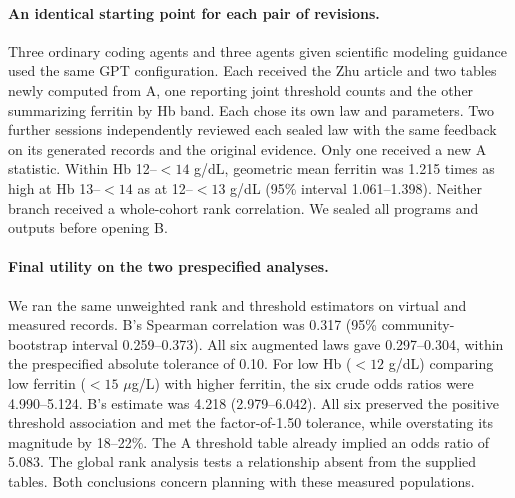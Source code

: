 \documentclass[sigconf,anonymous,review]{acmart}
\begin{document}
\paragraph{An identical starting point for each pair of revisions.}
Three ordinary coding agents and three agents given scientific modeling guidance used the same GPT configuration. Each received the Zhu article and two tables newly computed from A, one reporting joint threshold counts and the other summarizing ferritin by Hb band. Each chose its own law and parameters. Two further sessions independently reviewed each sealed law with the same feedback on its generated records and the original evidence. Only one received a new A statistic. Within Hb 12--$<14$ g/dL, geometric mean ferritin was 1.215 times as high at Hb 13--$<14$ as at 12--$<13$ g/dL (95\% interval 1.061--1.398). Neither branch received a whole-cohort rank correlation. We sealed all programs and outputs before opening B.

\paragraph{Final utility on the two prespecified analyses.}
We ran the same unweighted rank and threshold estimators on virtual and measured records. B's Spearman correlation was 0.317 (95\% community-bootstrap interval 0.259--0.373). All six augmented laws gave 0.297--0.304, within the prespecified absolute tolerance of 0.10. For low Hb ($<12$ g/dL) comparing low ferritin ($<15$ $\mu$g/L) with higher ferritin, the six crude odds ratios were 4.990--5.124. B's estimate was 4.218 (2.979--6.042). All six preserved the positive threshold association and met the factor-of-1.50 tolerance, while overstating its magnitude by 18--22\%. The A threshold table already implied an odds ratio of 5.083. The global rank analysis tests a relationship absent from the supplied tables. Both conclusions concern planning with these measured populations.
\end{document}

